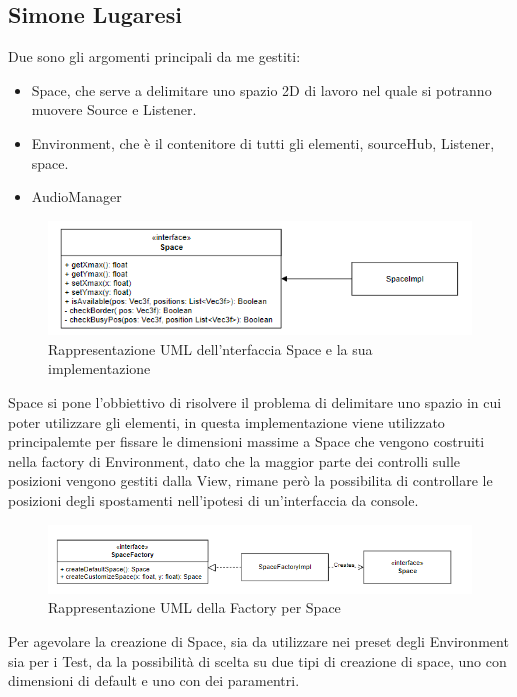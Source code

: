 \documentclass[a4paper,12pt]{report}
\begin{document}
\subsection*{Simone Lugaresi}
Due sono gli argomenti principali da me gestiti:
\begin{itemize}
	\item Space, che serve a delimitare uno spazio 2D di lavoro nel quale si potranno muovere Source e Listener.
	\item Environment, che è il contenitore di tutti gli elementi, sourceHub, Listener, space.
	\item AudioManager
\end{itemize}

\begin{figure}[H]
\centering{}
\includegraphics[width=\textwidth]{img/space/Space.png}
\caption{Rappresentazione UML dell'nterfaccia Space e la sua implementazione}
\label{img:space}
\end{figure}
Space si pone l'obbiettivo di risolvere il problema di delimitare uno spazio in cui poter utilizzare gli elementi, in questa implementazione viene utilizzato principalemte per fissare le dimensioni massime a Space che vengono costruiti nella factory di Environment, dato che la maggior parte dei controlli sulle posizioni vengono gestiti dalla View, rimane però la possibilita di controllare le posizioni degli spostamenti nell'ipotesi di un'interfaccia da console.
%
\begin{figure}[H]
\centering{}
\includegraphics[width=\textwidth]{img/space/SpaceFactory.png}
\caption{Rappresentazione UML della Factory per Space}
\label{img:spacefactory}
\end{figure}
Per agevolare la creazione di Space, sia da utilizzare nei preset degli Environment sia per i Test, da la possibilità di scelta su due tipi di creazione di space, uno con dimensioni di default e uno con dei paramentri.
\end{document}
